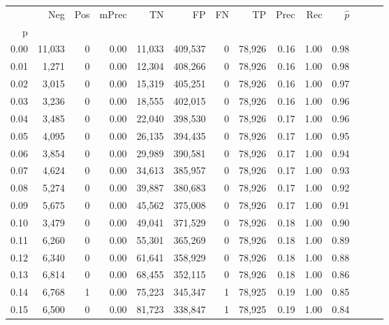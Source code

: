 \begin{tabular}{rrrrrrrrrrrrrr}
\toprule
{} &     Neg &    Pos & mPrec &       TN &       FP &      FN &      TP &  Prec &   Rec & $\hat{p}$ \\
p    &         &        &       &          &          &         &         &       &       &           \\
\midrule
0.00 &  11,033 &      0 &  0.00 &   11,033 &  409,537 &       0 &  78,926 &  0.16 &  1.00 &      0.98 \\
0.01 &   1,271 &      0 &  0.00 &   12,304 &  408,266 &       0 &  78,926 &  0.16 &  1.00 &      0.98 \\
0.02 &   3,015 &      0 &  0.00 &   15,319 &  405,251 &       0 &  78,926 &  0.16 &  1.00 &      0.97 \\
0.03 &   3,236 &      0 &  0.00 &   18,555 &  402,015 &       0 &  78,926 &  0.16 &  1.00 &      0.96 \\
0.04 &   3,485 &      0 &  0.00 &   22,040 &  398,530 &       0 &  78,926 &  0.17 &  1.00 &      0.96 \\
0.05 &   4,095 &      0 &  0.00 &   26,135 &  394,435 &       0 &  78,926 &  0.17 &  1.00 &      0.95 \\
0.06 &   3,854 &      0 &  0.00 &   29,989 &  390,581 &       0 &  78,926 &  0.17 &  1.00 &      0.94 \\
0.07 &   4,624 &      0 &  0.00 &   34,613 &  385,957 &       0 &  78,926 &  0.17 &  1.00 &      0.93 \\
0.08 &   5,274 &      0 &  0.00 &   39,887 &  380,683 &       0 &  78,926 &  0.17 &  1.00 &      0.92 \\
0.09 &   5,675 &      0 &  0.00 &   45,562 &  375,008 &       0 &  78,926 &  0.17 &  1.00 &      0.91 \\
0.10 &   3,479 &      0 &  0.00 &   49,041 &  371,529 &       0 &  78,926 &  0.18 &  1.00 &      0.90 \\
0.11 &   6,260 &      0 &  0.00 &   55,301 &  365,269 &       0 &  78,926 &  0.18 &  1.00 &      0.89 \\
0.12 &   6,340 &      0 &  0.00 &   61,641 &  358,929 &       0 &  78,926 &  0.18 &  1.00 &      0.88 \\
0.13 &   6,814 &      0 &  0.00 &   68,455 &  352,115 &       0 &  78,926 &  0.18 &  1.00 &      0.86 \\
0.14 &   6,768 &      1 &  0.00 &   75,223 &  345,347 &       1 &  78,925 &  0.19 &  1.00 &      0.85 \\
0.15 &   6,500 &      0 &  0.00 &   81,723 &  338,847 &       1 &  78,925 &  0.19 &  1.00 &      0.84 \\

\end{tabular}
